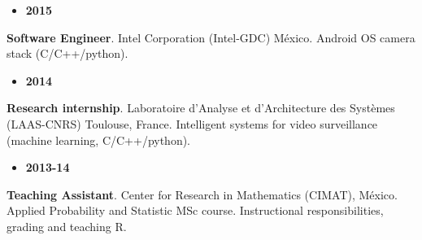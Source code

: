 \documentclass[10 pt]{article}
\begin{document}
\vspace{-0.3cm}
\begin{minipage}[t][.7cm]{0.12\textwidth}
\setlength{\leftmargini}{0.1em}
\begin{itemize}
%
\item \textbf{2015}
%
\end{itemize}
\end{minipage}\begin{minipage}[t][.7cm]{0.85\textwidth}

\textbf{Software Engineer}. Intel Corporation (Intel-GDC) México. Android OS camera stack (C/C++/python).

\end{minipage}
%

\vspace{0.15cm}
\begin{minipage}[t][1.1cm]{0.12\textwidth}
\setlength{\leftmargini}{0.1em}
\begin{itemize}
%
\item \textbf{2014}
%
\end{itemize}
\end{minipage}\begin{minipage}[t][1.4cm]{0.85\textwidth}
%
\textbf{Research internship}. Laboratoire d'Analyse et d'Architecture des Systèmes (LAAS-CNRS)
Toulouse, France. 
Intelligent systems for video surveillance (machine learning, C/C++/python).
%
%
\end{minipage}
%

\vspace{-0.5cm}
\begin{minipage}[t][.7cm]{0.12\textwidth}
\setlength{\leftmargini}{0.1em}
%
\begin{itemize}
%
%
\item \textbf{2013-14}
%
%
\end{itemize}
\end{minipage}\begin{minipage}[t][.7cm]{0.85\textwidth}
%
%
\textbf{Teaching Assistant}. Center for Research in Mathematics (CIMAT), México.
Applied Probability and Statistic MSc course.
Instructional responsibilities, grading and teaching R.
%
%
\end{minipage}
%
%
%
%
\end{document}
